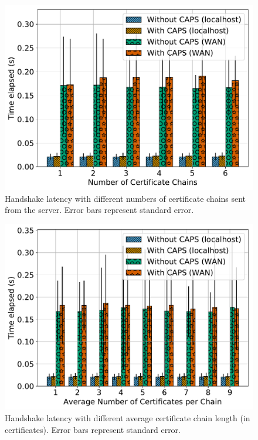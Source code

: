 \begin{figure}[t]
  \centering
  \includegraphics[width=\linewidth]{fig/eval_tls_ext/1-time_elapsed_vs_num_chains_sent}
  \caption{Handshake latency with different numbers of certificate chains sent
  from the server. Error bars represent standard error.}
  \label{fig:evaltlsext:numchain}
\end{figure}

\begin{figure}[t]
  \centering
  \includegraphics[width=\linewidth]{fig/eval_tls_ext/2-time_elapsed_vs_num_certs_per_chain}
  \caption{Handshake latency with different average certificate chain length (in
  certificates). Error bars represent standard error.}
  \label{fig:evaltlsext:numcert}
\end{figure}

